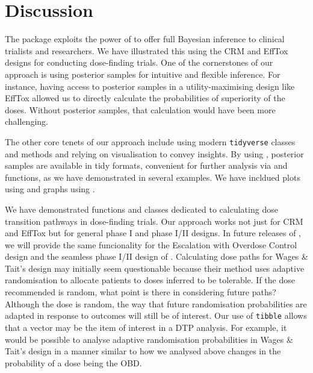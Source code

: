 \documentclass[article]{jss}
\begin{document}
\hypertarget{discussion}{%
\section{Discussion}\label{discussion}}

The  package exploits the power of  to offer
full Bayesian inference to clinical trialists and researchers. We have
illustrated this using the CRM and EffTox designs for conducting
dose-finding trials. One of the cornerstones of our approach is using
posterior samples for intuitive and flexible inference. For instance,
having access to posterior samples in a utility-maximising design like
EffTox allowed us to directly calculate the probabilities of superiority
of the doses. Without posterior samples, that calculation would have
been more challenging.

The other core tenets of our approach include using modern
\texttt{tidyverse} \citep{tidyverse} classes and methods and relying on
visualisation to convey insights. By using 
\citep{tidybayes}, posterior samples are available in tidy formats,
convenient for further analysis via  \citep{dplyr} and
 \citep{purrr} functions, as we have demonstrated in several
examples. We have incldued plots using  \citep{ggplot2} and
graphs using  \citep{DiagrammeR}.

We have demonstrated functions and classes dedicated to calculating dose
transition pathways in dose-finding trials. Our approach works not just
for CRM and EffTox but for general phase I and phase I/II designs. In
future releases of , we will provide the same funcionality
for the Escalation with Overdose Control design \citep{Tighiouart2010}
and the seamless phase I/II design of \citet{Wages2014}. Calculating
dose paths for Wages \& Tait's design may initially seem questionable
because their method uses adaptive randomisation to allocate patients to
doses inferred to be tolerable. If the dose recommended is random, what
point is there in considering future paths? Although the dose is random,
the way that future randomisation probabilities are adapted in response
to outcomes will still be of interest. Our use of \texttt{tibble} allows
that a vector may be the item of interest in a DTP analysis. For
example, it would be possible to analyse adaptive randomisation
probabilities in Wages \& Tait's design in a manner similar to how we
analysed above changes in the probability of a dose being the OBD.
\end{document}

